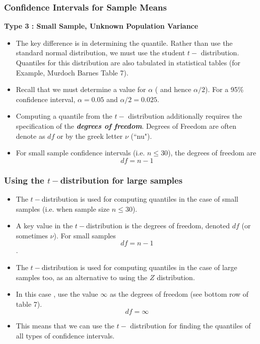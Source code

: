 \begin{frame}
\frametitle{Confidence Intervals for Sample Means}
\textbf{Type 3 : Small Sample, Unknown Population Variance}\\
\begin{itemize}
\item The key difference is in determining the quantile. Rather than use the standard normal distribution, we must use the student $t-$ distribution. Quantiles for this distribution are also tabulated in statistical tables (for Example, Murdoch Barnes Table 7).
\item Recall that we must determine a value for $\alpha$ ( and hence $\alpha/2$). For a 95\% confidence interval, $\alpha= 0.05$  and $\alpha/2 = 0.025$.
\item Computing a quantile from the $t-$ distribution additionally requires the specification of the \textit{\textbf{degrees of freedom}}. Degrees of Freedom are often denote as $df$ or by the greek letter $\nu$ (``nu").
\item For small sample confidence intervals (i.e. $n \leq 30$), the degrees of freedom are
\[ df = n-1 \]
\end{itemize}
\end{frame}




\begin{frame}
\frametitle{Using the $t-$distribution for large samples}

\begin{itemize}
\item The $t-$distribution is used for computing quantiles in the case of small samples (i.e. when sample size $n \leq 30$).
\item A key value in the $t-$distribution is the degrees of freedom, denoted $df$ (or sometimes $\nu$). For small samples \[ df= n-1\].
\item The $t-$distribution is used for computing quantiles in the case of large samples too, as an alternative to using the $Z$ distribution.
\item In this case , use the value $\infty$ as the degrees of freedom (see bottom row of table 7).
\[ df= \infty\]
\item This means that we can use the $t-$ distribution for finding the quantiles of all types of confidence intervals.

\end{itemize}
\end{frame}

